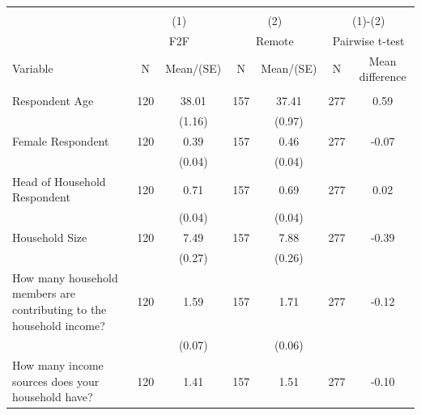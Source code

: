 
\begin{tabular}{@{\extracolsep{5pt}}lcccccc}
\\[-1.8ex]\hline \hline \\[-1.8ex]
 & \multicolumn{2}{c}{(1)}  & \multicolumn{2}{c}{(2)}  & \multicolumn{2}{c}{(1)-(2)} \\
 & \multicolumn{2}{c}{F2F}  & \multicolumn{2}{c}{Remote}  & \multicolumn{2}{c}{Pairwise t-test}  \\
Variable & N & Mean/(SE) & N & Mean/(SE) & N & Mean difference \\ \hline \\[-1.8ex] 
Respondent Age   & 120    & 38.01    & 157    & 37.41    & 277    & 0.59   \\
 &   & (1.16)  &   & (0.97)  &   &  \\ [1ex]
Female Respondent   & 120    & 0.39    & 157    & 0.46    & 277    & -0.07   \\
 &   & (0.04)  &   & (0.04)  &   &  \\ [1ex]
Head of Household Respondent   & 120    & 0.71    & 157    & 0.69    & 277    & 0.02   \\
 &   & (0.04)  &   & (0.04)  &   &  \\ [1ex]
Household Size   & 120    & 7.49    & 157    & 7.88    & 277    & -0.39   \\
 &   & (0.27)  &   & (0.26)  &   &  \\ [1ex]
How many household members are contributing to the household income?   & 120    & 1.59    & 157    & 1.71    & 277    & -0.12   \\
 &   & (0.07)  &   & (0.06)  &   &  \\ [1ex]
How many income sources does your household have?   & 120    & 1.41    & 157    & 1.51    & 277    & -0.10   \\

\end{tabular}
